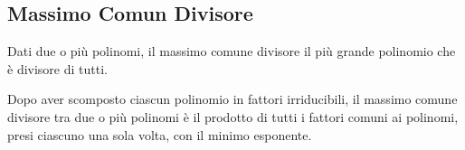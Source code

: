 \subsection{Massimo Comun Divisore}
Dati due o più polinomi, il massimo comune divisore il più grande polinomio 
che è divisore di tutti.

\begin{teorema}{}{}
Dopo aver scomposto ciascun polinomio in fattori irriducibili, il massimo 
comune divisore tra due o più polinomi è il prodotto di tutti i fattori 
comuni ai polinomi, presi ciascuno una sola volta, con il minimo esponente.
\end{teorema}




